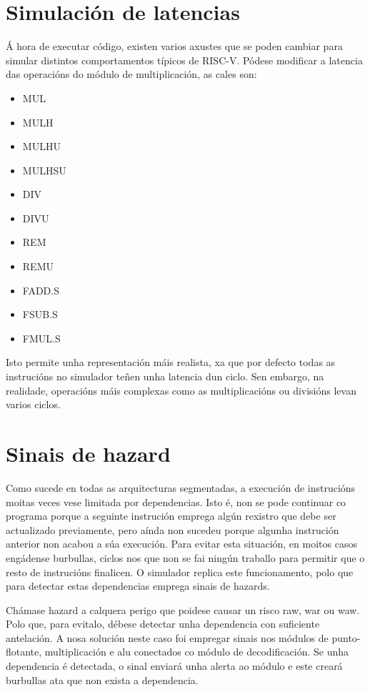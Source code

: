 \section{Simulación de latencias}\label{sec:sim_latencias}
Á hora de executar código, existen varios axustes que se poden cambiar para simular distintos comportamentos típicos de RISC-V. Pódese modificar a latencia  das operacións do módulo de multiplicación, as cales son: 
\begin{itemize}
    \item MUL
    \item MULH
    \item MULHU
    \item MULHSU
    \item DIV
    \item DIVU
    \item REM
    \item REMU
    \item FADD.S
    \item FSUB.S
    \item FMUL.S
\end{itemize}
Isto permite unha representación máis realista, xa que por defecto todas as instrucións no simulador teñen unha latencia dun ciclo. Sen embargo, na realidade, operacións máis complexas como as multiplicacións ou divisións levan varios ciclos.

\section{Sinais de hazard}\label{sec:hazards}
Como sucede en todas as \gls{arquitecturas} segmentadas, a execución de instrucións moitas veces vese limitada por dependencias. Isto é, non se pode continuar co programa porque a seguinte instrución emprega algún rexistro que debe ser actualizado previamente, pero aínda non sucedeu porque algunha instrución anterior non acabou a súa execución. Para evitar esta situación, en moitos casos engádense burbullas, ciclos nos que non se fai ningún traballo para permitir que o resto de instrucións finalicen. O simulador replica este funcionamento, polo que para detectar estas dependencias emprega sinais de \gls{hazards}.

Chámase hazard a calquera perigo que poidese causar un risco \acrfull{raw}, \acrfull{war} ou \acrfull{waw}. Polo que, para evitalo, débese detectar unha dependencia con suficiente antelación. A nosa solución neste caso foi empregar sinais nos módulos de punto-flotante, multiplicación e \acrshort{alu} conectados co módulo de decodificación. Se unha dependencia é detectada, o sinal enviará unha alerta ao módulo e este creará burbullas ata que non exista a dependencia.